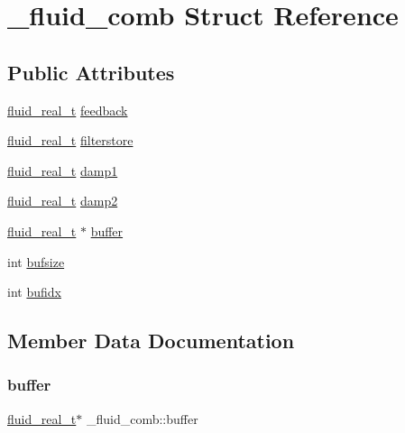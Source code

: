 \hypertarget{struct__fluid__comb}{}\section{\+\_\+fluid\+\_\+comb Struct Reference}
\label{struct__fluid__comb}
\subsection*{Public Attributes}
\begin{DoxyCompactItemize}
\item 
\hyperlink{fluidsynth__priv_8h_a9e96f0917747b69cabb7c671bc693dbb}{fluid\+\_\+real\+\_\+t} \hyperlink{struct__fluid__comb_ad94390e338a44120748e6cf446ab5ef1}{feedback}
\item 
\hyperlink{fluidsynth__priv_8h_a9e96f0917747b69cabb7c671bc693dbb}{fluid\+\_\+real\+\_\+t} \hyperlink{struct__fluid__comb_a52d450869a07862b168617759e025819}{filterstore}
\item 
\hyperlink{fluidsynth__priv_8h_a9e96f0917747b69cabb7c671bc693dbb}{fluid\+\_\+real\+\_\+t} \hyperlink{struct__fluid__comb_a4e8d996189a50c09e85f4388872c54d0}{damp1}
\item 
\hyperlink{fluidsynth__priv_8h_a9e96f0917747b69cabb7c671bc693dbb}{fluid\+\_\+real\+\_\+t} \hyperlink{struct__fluid__comb_ab29ff3f46d2d9a7277a80b86a2e35008}{damp2}
\item 
\hyperlink{fluidsynth__priv_8h_a9e96f0917747b69cabb7c671bc693dbb}{fluid\+\_\+real\+\_\+t} $\ast$ \hyperlink{struct__fluid__comb_a46f9c845ccef5871ba5a6939995a239d}{buffer}
\item 
int \hyperlink{struct__fluid__comb_a12ba7dddd473b3165beef8fcd7b3d972}{bufsize}
\item 
int \hyperlink{struct__fluid__comb_ae69643c75f700881d53bcbb65bf9212a}{bufidx}
\end{DoxyCompactItemize}


\subsection{Member Data Documentation}
\mbox{\label{struct__fluid__comb_a46f9c845ccef5871ba5a6939995a239d}} 
\subsubsection{\texorpdfstring{buffer}{buffer}}
{\footnotesize\ttfamily \hyperlink{fluidsynth__priv_8h_a9e96f0917747b69cabb7c671bc693dbb}{fluid\+\_\+real\+\_\+t}$\ast$ \+\_\+fluid\+\_\+comb\+::buffer}

